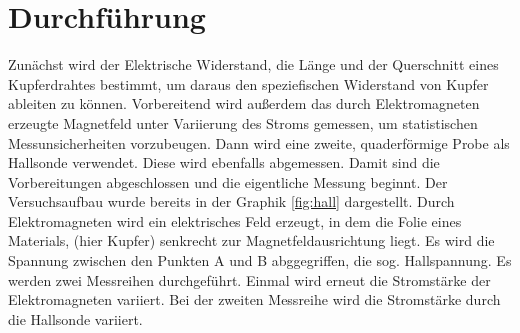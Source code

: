 \section{Durchführung}
\label{sec:Durchfuehrung}

Zunächst wird der Elektrische Widerstand, die Länge und der Querschnitt eines Kupferdrahtes bestimmt,
um daraus den speziefischen Widerstand von Kupfer ableiten zu können. 
Vorbereitend wird außerdem das durch Elektromagneten erzeugte Magnetfeld 
unter Variierung des Stroms gemessen, um statistischen Messunsicherheiten vorzubeugen.
Dann wird eine zweite, quaderförmige Probe als Hallsonde verwendet. Diese wird ebenfalls
abgemessen. 
Damit sind die Vorbereitungen abgeschlossen und die eigentliche Messung beginnt.
Der Versuchsaufbau wurde bereits in der Graphik \ref{fig:hall} dargestellt.
Durch Elektromagneten wird ein elektrisches Feld erzeugt, in dem die Folie eines Materials,
(hier Kupfer) senkrecht zur Magnetfeldausrichtung liegt. Es wird die Spannung zwischen 
den Punkten A und B abggegriffen, die sog. Hallspannung.
Es werden zwei Messreihen durchgeführt. Einmal wird erneut die Stromstärke der 
Elektromagneten variiert. Bei der zweiten Messreihe wird die Stromstärke durch die Hallsonde variiert.
